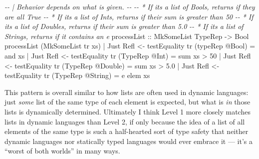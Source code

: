 \documentclass[]{article}
\newenvironment{Shaded}{}{}
\newcommand{\CharTok}[1]{\textcolor[rgb]{0.25,0.44,0.63}{#1}}
\newcommand{\CommentTok}[1]{\textcolor[rgb]{0.38,0.63,0.69}{\textit{#1}}}
\newcommand{\DataTypeTok}[1]{\textcolor[rgb]{0.56,0.13,0.00}{#1}}
\newcommand{\DecValTok}[1]{\textcolor[rgb]{0.25,0.63,0.44}{#1}}
\newcommand{\FloatTok}[1]{\textcolor[rgb]{0.25,0.63,0.44}{#1}}
\newcommand{\FunctionTok}[1]{\textcolor[rgb]{0.02,0.16,0.49}{#1}}
\newcommand{\NormalTok}[1]{#1}
\newcommand{\OperatorTok}[1]{\textcolor[rgb]{0.40,0.40,0.40}{#1}}
\newcommand{\OtherTok}[1]{\textcolor[rgb]{0.00,0.44,0.13}{#1}}
\begin{document}
\begin{Shaded}
\begin{Highlighting}[]
\CommentTok{{-}{-} | Behavior depends on what is given.}
\CommentTok{{-}{-}}
\CommentTok{{-}{-} * If it\textquotesingle{}s a list of Bools, returns if they are all True}
\CommentTok{{-}{-} * If it\textquotesingle{}s a list of Ints, returns if their sum is greater than 50}
\CommentTok{{-}{-} * If it\textquotesingle{}s a list of Doubles, returns if their sum is greater than 5.0}
\CommentTok{{-}{-} * If it\textquotesingle{}s a list of Strings, returns if it contains an \textquotesingle{}e\textquotesingle{}}
\OtherTok{processList ::} \DataTypeTok{MkSomeList} \DataTypeTok{TypeRep} \OtherTok{{-}\textgreater{}} \DataTypeTok{Bool}
\NormalTok{processList (}\DataTypeTok{MkSomeList}\NormalTok{ tr xs)}
    \OperatorTok{|} \DataTypeTok{Just} \DataTypeTok{Refl} \OtherTok{\textless{}{-}}\NormalTok{ testEquality tr (typeRep }\OperatorTok{@}\DataTypeTok{Bool}\NormalTok{)   }\OtherTok{=} \FunctionTok{and}\NormalTok{ xs}
    \OperatorTok{|} \DataTypeTok{Just} \DataTypeTok{Refl} \OtherTok{\textless{}{-}}\NormalTok{ testEquality tr (}\DataTypeTok{TypeRep} \OperatorTok{@}\DataTypeTok{Int}\NormalTok{)    }\OtherTok{=} \FunctionTok{sum}\NormalTok{ xs }\OperatorTok{\textgreater{}} \DecValTok{50}
    \OperatorTok{|} \DataTypeTok{Just} \DataTypeTok{Refl} \OtherTok{\textless{}{-}}\NormalTok{ testEquality tr (}\DataTypeTok{TypeRep} \OperatorTok{@}\DataTypeTok{Double}\NormalTok{) }\OtherTok{=} \FunctionTok{sum}\NormalTok{ xs }\OperatorTok{\textgreater{}} \FloatTok{5.0}
    \OperatorTok{|} \DataTypeTok{Just} \DataTypeTok{Refl} \OtherTok{\textless{}{-}}\NormalTok{ testEquality tr (}\DataTypeTok{TypeRep} \OperatorTok{@}\DataTypeTok{String}\NormalTok{) }\OtherTok{=} \CharTok{\textquotesingle{}e\textquotesingle{}} \OtherTok{\textasciigrave{}elem\textasciigrave{}}\NormalTok{ xs}
\end{Highlighting}
\end{Shaded}

This pattern is overall similar to how lists are often used in dynamic
languages: just \emph{some} list of the same type of each element is expected,
but what is \emph{in} those lists is dynamically determined. Ultimately I think
Level 1 more closely matches lists in dynamic languages than Level 2, if only
because the idea of a list of all elements of the same type is such a
half-hearted sort of type safety that neither dynamic languages nor statically
typed languages would ever embrace it --- it's a ``worst of both worlds'' in
many ways.
\end{document}
